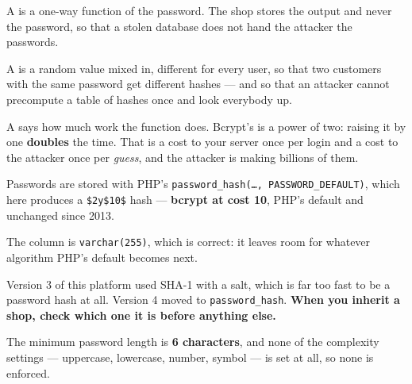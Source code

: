 \begin{definitionbox}
A  is a one-way function of the password. The shop stores
the output and never the password, so that a stolen database does not hand the
attacker the passwords.

\smallskip
A  is a random value mixed in, different for every user, so that two
customers with the same password get different hashes --- and so that an
attacker cannot precompute a table of hashes once and look everybody up.

\smallskip
A  says how much work the function does. Bcrypt's is a power
of two: raising it by one \textbf{doubles} the time. That is a cost to your
server once per login and a cost to the attacker once per \emph{guess}, and
the attacker is making billions of them.
\end{definitionbox}

\begin{examplebox}
\begin{tight}
  \item Passwords are stored with PHP's \texttt{password\_hash(\dots,
        PASSWORD\_DEFAULT)}, which here produces a \texttt{\$2y\$10\$} hash ---
        \textbf{bcrypt at cost 10}, PHP's default and unchanged since 2013.
  \item The column is \texttt{varchar(255)}, which is correct: it leaves room
        for whatever algorithm PHP's default becomes next.
  \item Version 3 of this platform used SHA-1 with a salt, which is far too
        fast to be a password hash at all. Version 4 moved to
        \texttt{password\_hash}. \textbf{When you inherit a shop, check which
        one it is before anything else.}
  \item The minimum password length is \textbf{6 characters}, and none of the
        complexity settings --- uppercase, lowercase, number, symbol --- is
        set at all, so none is enforced.
\end{tight}
\end{examplebox}

